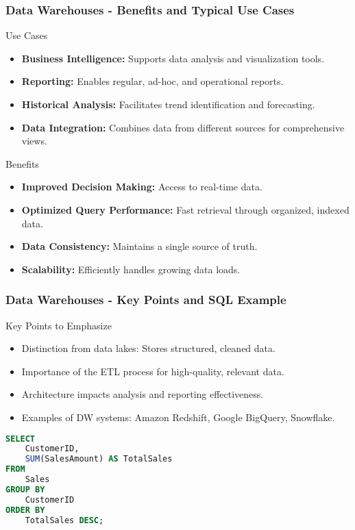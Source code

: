 \documentclass[aspectratio=169]{beamer}
\begin{document}
\begin{frame}[fragile]
    \frametitle{Data Warehouses - Benefits and Typical Use Cases}
    \begin{block}{Use Cases}
        \begin{itemize}
            \item \textbf{Business Intelligence:} Supports data analysis and visualization tools.
            \item \textbf{Reporting:} Enables regular, ad-hoc, and operational reports.
            \item \textbf{Historical Analysis:} Facilitates trend identification and forecasting.
            \item \textbf{Data Integration:} Combines data from different sources for comprehensive views.
        \end{itemize}
    \end{block}
    
    \begin{block}{Benefits}
        \begin{itemize}
            \item \textbf{Improved Decision Making:} Access to real-time data.
            \item \textbf{Optimized Query Performance:} Fast retrieval through organized, indexed data.
            \item \textbf{Data Consistency:} Maintains a single source of truth.
            \item \textbf{Scalability:} Efficiently handles growing data loads.
        \end{itemize}
    \end{block}
\end{frame}

\begin{frame}[fragile]
    \frametitle{Data Warehouses - Key Points and SQL Example}
    \begin{block}{Key Points to Emphasize}
        \begin{itemize}
            \item Distinction from data lakes: Stores structured, cleaned data.
            \item Importance of the ETL process for high-quality, relevant data.
            \item Architecture impacts analysis and reporting effectiveness.
            \item Examples of DW systems: Amazon Redshift, Google BigQuery, Snowflake.
        \end{itemize}
    \end{block}

    \begin{lstlisting}[language=SQL, caption={SQL Example for Data Access}]
SELECT 
    CustomerID, 
    SUM(SalesAmount) AS TotalSales 
FROM 
    Sales 
GROUP BY 
    CustomerID 
ORDER BY 
    TotalSales DESC;
    \end{lstlisting}
\end{frame}
\end{document}
